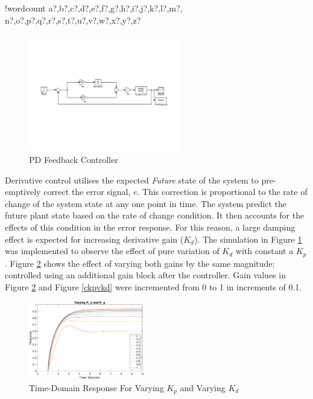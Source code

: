 \documentclass[11pt]{article}
\newcounter{words}
\newenvironment{counted}{%
  \setcounter{words}{0}
  \SearchList!{wordcount}{\stepcounter{words}}
    {a?,b?,c?,d?,e?,f?,g?,h?,i?,j?,k?,l?,m?,
    n?,o?,p?,q?,r?,s?,t?,u?,v?,w?,x?,y?,z?}
  \UndoBoundary{'}
  \SearchOrder{p;}}{%
  \StopSearching}
\begin{document}
\begin{counted}
\begin{figure}
\centering
\vspace{-35pt} %
\includegraphics[trim = 0 0 0 0, clip, width=0.59\textwidth]{pd2.pdf}
\vspace{-10pt}
\caption{PD Feedback Controller}
\label{pd2}
\vspace{-20pt}
\end{figure}

Derivative control utilises the expected \emph{Future} state of the
system to pre-emptively correct the error signal, \(e\). This correction
is proportional to the rate of change of the system state at any one
point in time. The system predict the future plant state based on the
rate of change condition. It then accounts for the effects of this
condition in the error response. For this reason, a large damping effect
is expected for increasing derivative gain (\(K_d\)). The simulation in
Figure \ref{pd2} was implemented to observe the effect of pure variation
of \(K_d\) with constant a \(K_p\). Figure \ref{vkpvkd} shows the effect
of varying both gains by the same magnitude; controlled using an
additional gain block after the controller. Gain values in Figure
\ref{vkpvkd} and Figure \ref{ckpvkd} were incremented from 0 to 1 in
increments of 0.1.

\begin{figure}
\centering
\vspace{-15pt} %
\includegraphics[trim = 0 0 0 0, clip, width=0.45\textwidth]{vkpvkd.eps}
\vspace{-10pt}
\caption{Time-Domain Response For Varying $K_p$ and Varying $K_d$}
\label{vkpvkd}
\vspace{-15pt}
\end{figure}


\end{counted}
\end{document}
